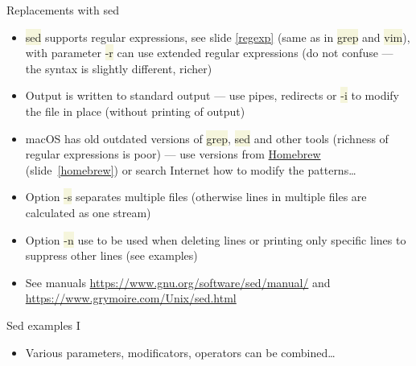 \documentclass[compress, xelatex, 11pt, xcolor=svgnames, aspectratio=169, url={hyphens, lowtilde}]{beamer}
\renewcommand{\texttt}[1]{\colorbox{Beige}{{\ttfamily #1}}}
\begin{document}
\begin{frame}{Replacements with sed}
	\begin{itemize}
		\item \texttt{sed} supports regular expressions, see slide \ref{regexp} (same as in \texttt{grep} and \texttt{vim}), with parameter \texttt{-r} can use extended regular expressions (do not confuse --- the syntax is slightly different, richer)
		\item Output is written to standard output --- use pipes, redirects or \texttt{-i} to modify the file in place (without printing of output)
		\item macOS has old outdated versions of \texttt{grep}, \texttt{sed} and other tools (richness of regular expressions is poor) --- use versions from \href{http://brew.sh/}{Homebrew} (slide~\ref{homebrew}) or search Internet how to modify the patterns\ldots
		\item Option \texttt{-s} separates multiple files (otherwise lines in multiple files are calculated as one stream)
		\item Option \texttt{-n} use to be used when deleting lines or printing only specific lines to suppress other lines (see examples)
		\item See manuals \url{https://www.gnu.org/software/sed/manual/} and \url{https://www.grymoire.com/Unix/sed.html}
	\end{itemize}
\end{frame}

\begin{frame}[fragile]{Sed examples I}
	\label{sedex}
	\begin{itemize}
		\item Various parameters, modificators, operators can be combined\ldots
	\end{itemize}
\end{frame}
\end{document}
